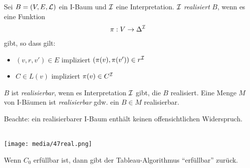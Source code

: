\begin{definition}[Realisierbarkeit]
    \label{def:realisierbarkeit}
Sei $B = \left( V,E,\ML \right)$ ein I-Baum und $\mathcal{I}$ eine Interpretation. $\mathcal{I}$
\emph{realisiert} $B$, wenn es eine Funktion
\begin{align*}
    \pi : V \rightarrow \Delta^{\mathcal{I}}
\end{align*}
gibt, so dass gilt:
\begin{itemize}
\item
  $\left( v,r,v' \right) \in E$ impliziert
  $\left( \pi\left( v \right),\pi\left( v' \right) \right) \in r^\MI$
\item
  $C \in L\left( v \right)$ impliziert
  $\pi\left( v \right) \in C^\MI$
\end{itemize}

$B$ ist \emph{realisierbar}, wenn es Interpretation $\mathcal{I}$ gibt, die $B$
realisiert. Eine Menge $M$ von I-Bäumen ist \emph{realisierbar} gdw. ein
$B \in M$ realisierbar.
\end{definition}

Beachte: ein realisierbarer I-Baum enthält keinen offensichtlichen Widerspruch.

\begin{tafel}\mbox{}\\

\texttt{[image: media/47real.png]}
\end{tafel}

\begin{theorem}
    Wenn $C_{0}$ erfüllbar ist, dann gibt der Tableau-Algorithmus \enquote{erfüllbar}
zurück.
\end{theorem}


